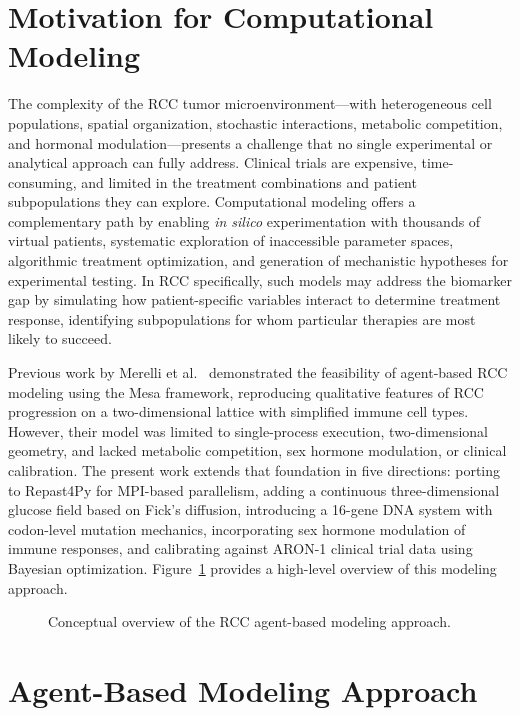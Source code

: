 \section{Motivation for Computational Modeling}
\label{sec:intro_motivation}

The complexity of the RCC tumor microenvironment---with heterogeneous cell populations, spatial organization, stochastic interactions, metabolic competition, and hormonal modulation---presents a challenge that no single experimental or analytical approach can fully address. Clinical trials are expensive, time-consuming, and limited in the treatment combinations and patient subpopulations they can explore. Computational modeling offers a complementary path by enabling \emph{in silico} experimentation with thousands of virtual patients, systematic exploration of inaccessible parameter spaces, algorithmic treatment optimization, and generation of mechanistic hypotheses for experimental testing. In RCC specifically, such models may address the biomarker gap by simulating how patient-specific variables interact to determine treatment response, identifying subpopulations for whom particular therapies are most likely to succeed.

Previous work by Merelli et al.~\cite{merelli2021} demonstrated the feasibility of agent-based RCC modeling using the Mesa framework, reproducing qualitative features of RCC progression on a two-dimensional lattice with simplified immune cell types. However, their model was limited to single-process execution, two-dimensional geometry, and lacked metabolic competition, sex hormone modulation, or clinical calibration. The present work extends that foundation in five directions: porting to Repast4Py for MPI-based parallelism, adding a continuous three-dimensional glucose field based on Fick's diffusion, introducing a 16-gene DNA system with codon-level mutation mechanics, incorporating sex hormone modulation of immune responses, and calibrating against ARON-1 clinical trial data using Bayesian optimization. Figure~\ref{fig:conceptual_overview} provides a high-level overview of this modeling approach.

\begin{figure}[htbp]
\centering
{}
\caption{Conceptual overview of the RCC agent-based modeling approach.}
\label{fig:conceptual_overview}
\end{figure}

\section{Agent-Based Modeling Approach}
\label{sec:intro_abm}

